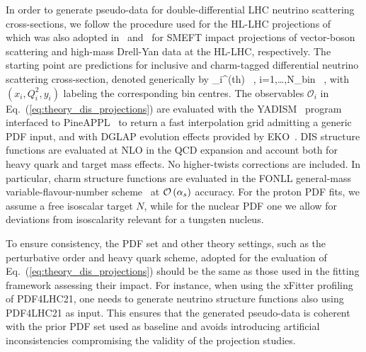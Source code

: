  In order to generate pseudo-data for double-differential
 LHC neutrino scattering cross-sections, we follow the procedure
 used for the HL-LHC projections of~\cite{AbdulKhalek:2018rok} which was
 also adopted in~\cite{Ethier:2021ydt} and~\cite{Greljo:2021kvv} for SMEFT impact projections
 of vector-boson scattering and high-mass Drell-Yan data at the HL-LHC, respectively.
 The starting point are predictions for inclusive and charm-tagged
 differential neutrino scattering cross-section, denoted generically by
 \be
 \label{eq:theory_dis_projections}
 _i^{{\rm (th)}} \equiv {} \, ,\quad
 i=1,\ldots,N_{\rm bin} \, ,
 \ee
 with $(x_i,Q^2_i,y_i)$ labeling the corresponding bin centres.
 The observables $\mathcal{O}_i $ in Eq.~(\ref{eq:theory_dis_projections})
are evaluated with the
{\sc\small YADISM}~\cite{yadism,Candido:2023utz} program
interfaced to {\sc\small PineAPPL}~\cite{Carrazza:2020gss, christopher_schwan_2023_7995675}
to return a fast interpolation grid admitting a generic PDF input,
and with DGLAP evolution effects provided by {\sc\small EKO}~\cite{Candido:2022tld}.
%
DIS structure functions are evaluated at NLO in the QCD expansion
and account both for heavy quark and target mass effects.
%
No higher-twists corrections are included.
%
In particular,
charm structure functions are evaluated in the FONLL general-mass variable-flavour-number
scheme~\cite{Forte:2010ta,Ball:2011mu,Faura:2020oom} at $\mathcal{O}\left( \alpha_s\right)$
accuracy.
%
For the proton PDF fits, we assume a free isoscalar target $N$, while
for the nuclear PDF one we allow for deviations from isoscalarity relevant
for a tungsten nucleus.

To ensure consistency, the PDF set and other theory settings, such as the perturbative
order and heavy quark scheme, adopted for the evaluation of
Eq.~(\ref{eq:theory_dis_projections}) should be the same as those
used in the fitting framework assessing their impact.
%
For instance, when using the {\sc\small xFitter} profiling of PDF4LHC21, one needs
 to generate  neutrino structure functions also using PDF4LHC21 as input.
This ensures that the generated pseudo-data is coherent with the prior PDF
 set used as baseline and avoids introducing artificial inconsistencies 
 compromising the validity of the projection studies.
 
